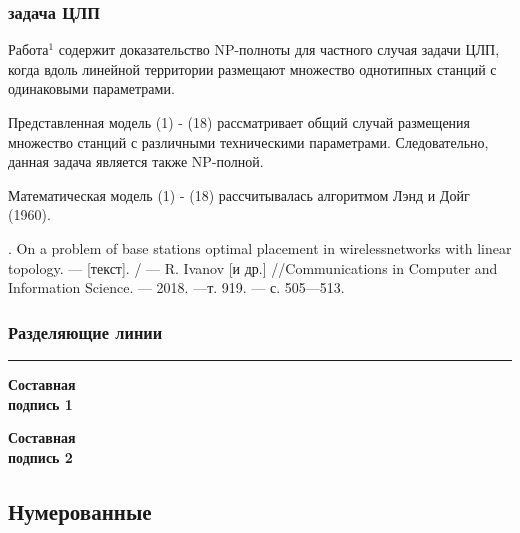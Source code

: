 \begin{frame}
    \frametitle{задача ЦЛП}
    
    
    Работа$^1$ содержит доказательство NP-полноты для частного случая задачи ЦЛП, когда вдоль линейной территории размещают множество однотипных станций с одинаковыми параметрами. 
    \bigskip
    
    Представленная модель (1) - (18) рассматривает общий случай размещения множество станций с различными техническими параметрами. Следовательно, данная задача является также NP-полной.
    \bigskip
    
    Математическая модель (1) - (18) рассчитывалась алгоритмом Лэнд и Дойг (1960).
    \bigskip

    \bigskip
    \bigskip
    \begin{minipage}[b]{0.99\linewidth}
        \fontsize{5pt}{7.2}. On a problem of base stations optimal placement in wirelessnetworks with linear topology. — [текст]. / — R. Ivanov [и др.] //Communications in Computer and Information Science. — 2018. —т. 919. — с. 505—513.
    \end{minipage}

\end{frame}

\begin{frame}
    \frametitle{Разделяющие линии}
    \begin{minipage}[c]{0.47\linewidth}
        
        \bigskip
        \hrule{}
        \bigskip
        \textbf{Составная \\ подпись 1}
    \end{minipage}
    \hfill
    \vrule{}
    \hfill
    \begin{minipage}[c]{0.47\linewidth}
        \flushright
        \textbf{Составная \\ подпись 2}
    \end{minipage}
\end{frame}

\begin{frame}

\end{frame}

\subsection{Нумерованные}

